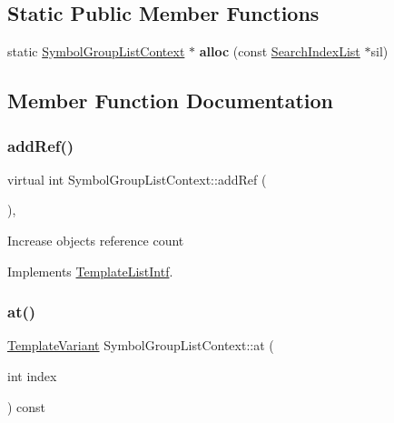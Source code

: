 \subsection*{Static Public Member Functions}
\begin{DoxyCompactItemize}
\item 
\mbox{\label{class_symbol_group_list_context_a06979589da1d4bf14ad6b87a9da2e705}} 
static \mbox{\hyperlink{class_symbol_group_list_context}{Symbol\+Group\+List\+Context}} $\ast$ {\bfseries alloc} (const \mbox{\hyperlink{class_search_index_list}{Search\+Index\+List}} $\ast$sil)
\end{DoxyCompactItemize}


\subsection{Member Function Documentation}
\mbox{\label{class_symbol_group_list_context_af075e8357cbbc474f2e71e31a9b40362}} 
\subsubsection{\texorpdfstring{addRef()}{addRef()}}
{\footnotesize\ttfamily virtual int Symbol\+Group\+List\+Context\+::add\+Ref (\begin{DoxyParamCaption}{ }\end{DoxyParamCaption})\hspace{0.3cm}{\ttfamily [inline]}, {\ttfamily [virtual]}}

Increase object\textquotesingle{}s reference count 

Implements \mbox{\hyperlink{class_template_list_intf_a4b4973e2e15396d10bc4e3085462ca2b}{Template\+List\+Intf}}.

\mbox{\label{class_symbol_group_list_context_aec1ee26a6f7899e37ba0b70c1ca5b744}} 
\subsubsection{\texorpdfstring{at()}{at()}}
{\footnotesize\ttfamily \mbox{\hyperlink{class_template_variant}{Template\+Variant}} Symbol\+Group\+List\+Context\+::at (\begin{DoxyParamCaption}\item[{int}]{index }\end{DoxyParamCaption}) const\hspace{0.3cm}{\ttfamily [virtual]}}

